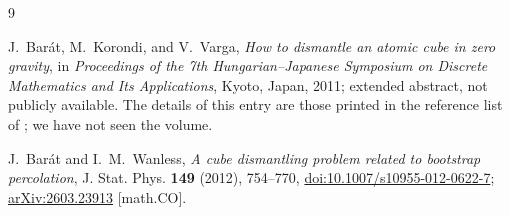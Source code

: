 \documentclass[11pt]{amsart}
\begin{document}
\begin{thebibliography}{9}

J.~Bar\'at, M.~Korondi, and V.~Varga,
\emph{How to dismantle an atomic cube in zero gravity},
in \emph{Proceedings of the 7th Hungarian--Japanese Symposium on Discrete
Mathematics and Its Applications}, Kyoto, Japan, 2011; extended abstract, not
publicly available. The details of this entry are those printed in the
reference list of \cite{BW}; we have not seen the volume.

J.~Bar\'at and I.~M.~Wanless,
\emph{A cube dismantling problem related to bootstrap percolation},
J. Stat. Phys. \textbf{149} (2012), 754--770,
\href{https://doi.org/10.1007/s10955-012-0622-7}
{doi:10.1007/s10955-012-0622-7};
\href{https://arxiv.org/abs/2603.23913}{arXiv:2603.23913} [math.CO].

\end{thebibliography}
\end{document}
